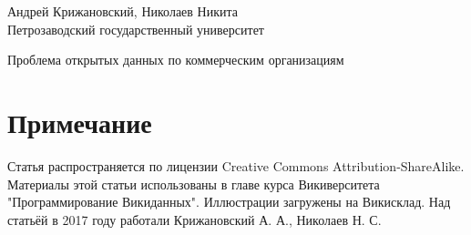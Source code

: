 \begin{center}
	{\normalsize Андрей Крижановский, Николаев Никита}
	\\Петрозаводский государственный университет
	
	{\Large \sc Проблема открытых данных по коммерческим организациям }
\end{center}

\section*{Примечание}

Статья распространяется по лицензии Creative Commons Attribution-ShareAlike. Материалы этой статьи использованы в главе курса Викиверситета "Программирование Викиданных"\cite{WDBusinessEnterprise}. Иллюстрации загружены на Викисклад. Над статьёй в 2017 году работали Крижановский А. А., Николаев Н. С. 